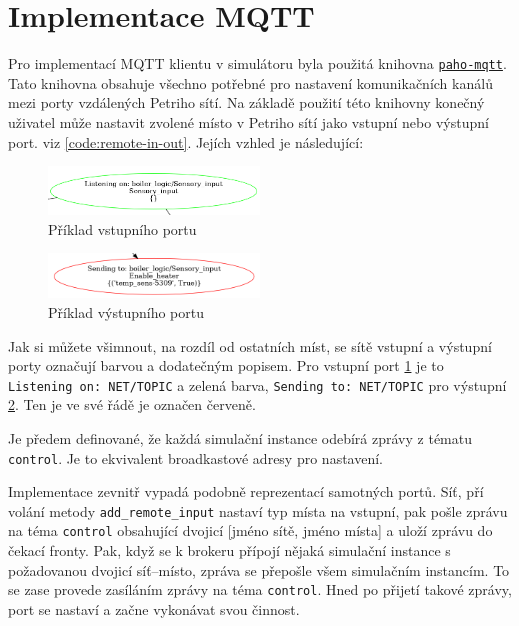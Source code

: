 \section{Implementace MQTT}
\label{subsec:mqtt_impl}

Pro implementací MQTT klientu v simulátoru byla použitá knihovna \href{https://pypi.org/project/paho-mqtt/}{\texttt{paho-mqtt}}. Tato knihovna obsahuje všechno potřebné pro nastavení komunikačních kanálů mezi porty vzdálených Petriho sítí. Na základě použití této knihovny konečný uživatel může nastavit zvolené místo v Petriho sítí jako vstupní nebo výstupní port. viz \ref{code:remote-in-out}. Jejích vzhled je následující:

\begin{figure}[hbt]
 \centering
 \includegraphics[width=0.5\textwidth]{obrazky-figures/port-in.png}
 \caption{Příklad vstupního portu}
 \label{port-in}
\end{figure}

\begin{figure}[hbt]
 \centering
 \includegraphics[width=0.5\textwidth]{obrazky-figures/port-out.png}
 \caption{Příklad výstupního portu}
 \label{port-out}
\end{figure}

Jak si můžete všimnout, na rozdíl od ostatních míst, se sítě vstupní a výstupní porty označují barvou a dodatečným popisem. Pro vstupní port \ref{port-in} je to \texttt{Listening on: NET/TOPIC} a zelená barva, \texttt{Sending to: NET/TOPIC} pro výstupní \ref{port-out}. Ten je ve své řádě je označen červeně.

Je předem definované, že každá simulační instance odebírá zprávy z tématu \texttt{control}. Je to ekvivalent broadkastové adresy pro nastavení.

Implementace zevnitř vypadá podobně reprezentací samotných portů. Síť, pří volání metody \texttt{add\_remote\_input} nastaví typ místa na vstupní, pak pošle zprávu na téma \texttt{control} obsahující dvojicí [jméno sítě, jméno místa] a uloží zprávu do čekací fronty. Pak, když se k brokeru přípojí nějaká simulační instance s požadovanou dvojicí síť--místo, zpráva se přepošle všem simulačním instancím. To se zase provede zasíláním zprávy na téma \texttt{control}. Hned po přijetí takové zprávy, port se nastaví a začne vykonávat svou činnost.

